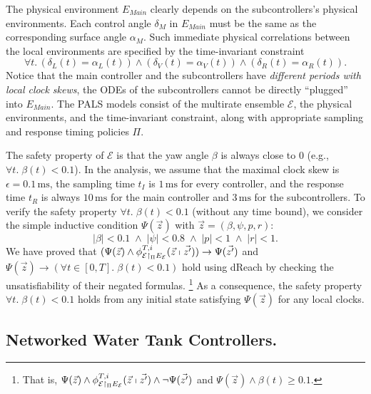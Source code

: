 The physical environment $E_\mathit{Main}$ clearly depends on the subcontrollers's physical environments.
Each control angle $\delta_M$ in  $E_\mathit{Main}$ must be the same as the corresponding surface angle $\alpha_M$.
%
Such  immediate physical correlations between the local %
environments are specified by the time-invariant constraint
%
\[\forall t.\, (\delta_L(t) = \alpha_L(t)) \wedge (\delta_V(t) = \alpha_V(t)) \wedge (\delta_R(t) = \alpha_R(t)).
\]
Notice that the main controller and the subcontrollers have \emph{different periods with local clock skews},
the ODEs of the subcontrollers cannot be directly ``plugged'' into $E_\mathit{Main}$.
The PALS models consist of the multirate ensemble $\mathcal{E}$, the physical environments, and the time-invariant constraint,
along with appropriate  sampling and response timing policies $\Pi$.

The safety property of $\mathcal{E}$ 
is that the yaw angle $\beta$ is always close to $0$ (e.g., $\forall t.\; \beta(t) < 0.1$).
In the analysis,
we assume that the maximal clock skew is $\epsilon = 0.1\,\mathrm{ms}$,
the sampling time $t_I$ is $1\,\mathrm{ms}$ for every controller,
and the response time $t_R$ is always $10\,\mathrm{ms}$ for the main controller
and $3\,\mathrm{ms}$ for the subcontrollers.
To verify the safety property $\forall t.\; \beta(t) < 0.1$ (without any time bound), 
we consider the simple inductive condition $\Psi(\vec{z})$ with $\vec{z} = (\beta,\psi,p,r)$:
\[
|\beta| < 0.1
\;\wedge\;
|\psi| < 0.8
\;\wedge\;
|p| < 1
\;\wedge\;
|r| < 1.
\]
We have proved that $(\Psi(\vec{z}) \wedge \phi_{\mathcal{E} \restriction_{\Pi} E_\mathcal{E}}^{T,i}(\vec{z}\shortmid\vec{z'})) \rightarrow \Psi(\vec{z'})$
and  $\Psi(\vec{z}) \rightarrow (\forall t \in [0,T].\; \beta(t) < 0.1)$ hold
using \textsf{dReach} by checking the unsatisfiability of their negated formulas.%
\footnote{That is,
 $\Psi(\vec{z}) \wedge \phi_{\mathcal{E} \restriction_{\Pi} E_\mathcal{E}}^{T,i}(\vec{z}\shortmid\vec{z'}) \wedge \neg \Psi(\vec{z'})$ and $\Psi(\vec{z}) \wedge \beta(t) \geq 0.1$.}
As a consequence, the safety property $\forall t.\; \beta(t) < 0.1$
holds from any initial state satisfying $\Psi(\vec{z})$ for any local clocks.



\subsection{Networked Water Tank Controllers.}

